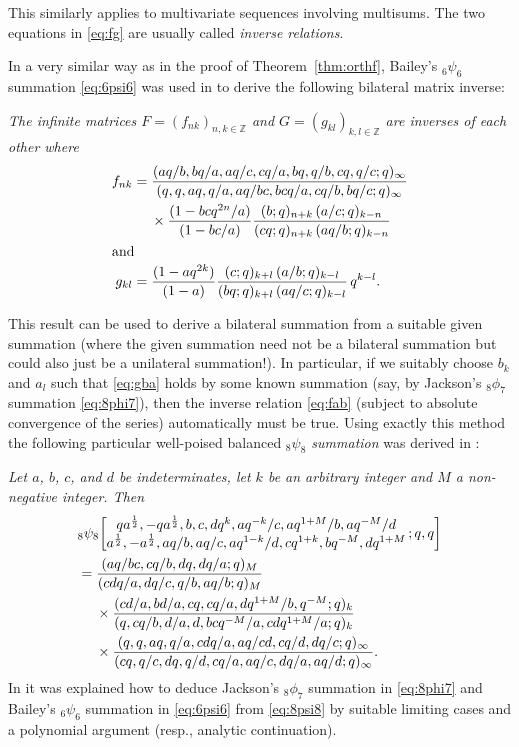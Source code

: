 \documentclass[reqno,12pt]{amsart}
\theoremstyle{remark}
\numberwithin{equation}{section}
\begin{document}
This similarly applies to multivariate sequences involving multisums.
The two equations in \eqref{eq:fg} are usually called \textit{inverse relations}.

In a very similar way as in the proof of Theorem~\ref{thm:orthf},
Bailey's ${}_6\psi_6$ summation \eqref{eq:6psi6}
was used in \cite[Theorem~3.1]{S3} to derive the following
bilateral matrix inverse:

\textit{The infinite matrices
$F=(f_{nk})_{n,k\in\mathbb Z}$ and $G=(g_{kl})_{k,l\in\mathbb Z}$ are
{\em inverses} of each other where
\begin{subequations}\label{eq:qmi}
\begin{align}
f_{nk}&=\frac{(aq/b,bq/a,aq/c,cq/a,bq,q/b,cq,q/c;q)_{\infty}}
{(q,q,aq,q/a,aq/bc,bcq/a,cq/b,bq/c;q)_{\infty}}\notag\\
&\quad\;\times\frac{(1-bcq^{2n}/a)}{(1-bc/a)}\frac{(b;q)_{n+k}\,(a/c;q)_{k-n}}
{(cq;q)_{n+k}\,(aq/b;q)_{k-n}}\\
\intertext{and}
g_{kl}&=\frac{(1-aq^{2k})}{(1-a)}\frac{(c;q)_{k+l}\,(a/b;q)_{k-l}}
{(bq;q)_{k+l}\,(aq/c;q)_{k-l}}\,q^{k-l}.
\end{align}
\end{subequations}}

This result can be used to derive a bilateral summation from a suitable
given summation (where the given summation need not be a bilateral summation
but could also just be a unilateral summation!).
In particular, if we suitably choose $b_k$ and $a_l$ such that
\eqref{eq:gba} holds by some known summation (say, by
Jackson's ${}_8\phi_7$ summation \eqref{eq:8phi7}),
then the inverse relation \eqref{eq:fab}
(subject to absolute convergence of the series)
automatically must be true. Using exactly this method
the following particular well-poised balanced
\textit{${}_8\psi_8$ summation}
was derived in \cite[Theorem~4.1]{S3}:

\textit{Let $a$, $b$, $c$, and $d$ be indeterminates,
let $k$ be an arbitrary integer and $M$ a non-negative integer. Then
\begin{align}\label{eq:8psi8}
&{}_8\psi_8\!\left[\begin{matrix}qa^{\frac 12},-qa^{\frac 12},b,c,dq^k,
aq^{-k}/c,aq^{1+M}/b,aq^{-M}/d\notag\\
a^{\frac 12},-a^{\frac 12},aq/b,aq/c,aq^{1-k}/d,
cq^{1+k},bq^{-M},dq^{1+M}\end{matrix}\,;q,q\right]\\
&=\frac {(aq/bc,cq/b,dq,dq/a;q)_M}
{(cdq/a,dq/c,q/b,aq/b;q)_M}\notag\\
&\quad\;\times
\frac{(cd/a,bd/a,cq,cq/a,dq^{1+M}/b,q^{-M};q)_k}
{(q,cq/b,d/a,d,bcq^{-M}/a,cdq^{1+M}/a;q)_k}\notag\\
&\quad\;\times
\frac{(q,q,aq,q/a,cdq/a,aq/cd,cq/d,dq/c;q)_{\infty}}
{(cq,q/c,dq,q/d,cq/a,aq/c,dq/a,aq/d;q)_{\infty}}.
\end{align}}
In \cite[p.~345]{S7} it was explained how to deduce Jackson's
$_8\phi_7$ summation in \eqref{eq:8phi7} and Bailey's $_6\psi_6$
summation in \eqref{eq:6psi6} from \eqref{eq:8psi8} by suitable
limiting cases and a polynomial argument (resp., analytic continuation).
\end{document}

